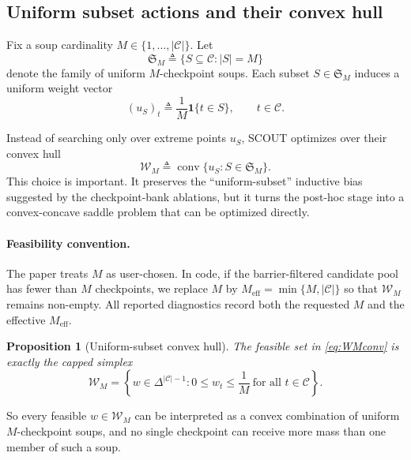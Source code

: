 \documentclass{article}
\newtheorem{proposition}{Proposition}
\newcommand{\cC}{\mathcal{C}}
\newcommand{\cW}{\mathcal{W}}
\newcommand{\simplex}{\Delta}
\newcommand{\scout}{\textup{\textsc{SCOUT}}}
\begin{document}
\subsection{Uniform subset actions and their convex hull}

Fix a soup cardinality \(M\in\{1,\dots,|\cC|\}\). Let
\[
    \mathfrak{S}_M
    \triangleq
    \{S\subseteq \cC : |S|=M\}
\]
denote the family of uniform \(M\)-checkpoint soups. Each subset \(S\in\mathfrak{S}_M\) induces a uniform weight vector
\begin{equation}
    (u_S)_t
    \triangleq
    \frac{1}{M}\mathbf{1}\{t\in S\},
    \qquad
    t\in\cC.
    \label{eq:uniform_subset}
\end{equation}

Instead of searching only over extreme points \(u_S\), \scout{} optimizes over their convex hull
\begin{equation}
    \cW_M
    \triangleq
    \operatorname{conv}\{u_S : S\in\mathfrak{S}_M\}.
    \label{eq:WMconv}
\end{equation}
This choice is important. It preserves the ``uniform-subset'' inductive bias suggested by the checkpoint-bank ablations, but it turns the post-hoc stage into a convex-concave saddle problem that can be optimized directly.

\paragraph{Feasibility convention.}
The paper treats \(M\) as user-chosen. In code, if the barrier-filtered candidate pool has fewer than \(M\) checkpoints, we replace \(M\) by \(M_{\mathrm{eff}}=\min\{M,|\cC|\}\) so that \(\cW_M\) remains non-empty. All reported diagnostics record both the requested \(M\) and the effective \(M_{\mathrm{eff}}\).

\begin{proposition}[Uniform-subset convex hull]
\label{prop:hypersimplex}
The feasible set in \eqref{eq:WMconv} is exactly the capped simplex
\begin{equation}
    \cW_M
    =
    \left\{
        w\in\simplex^{|\cC|-1} :
        0\le w_t \le \frac{1}{M}
        \ \text{for all } t\in\cC
    \right\}.
    \label{eq:hypersimplex}
\end{equation}
\end{proposition}

So every feasible \(w\in\cW_M\) can be interpreted as a convex combination of uniform \(M\)-checkpoint soups, and no single checkpoint can receive more mass than one member of such a soup.
\end{document}
